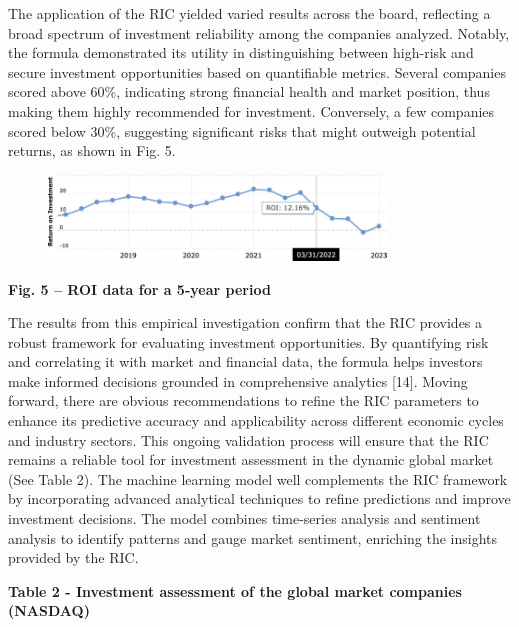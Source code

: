 {The application of the RIC yielded varied results across the board,
reflecting a broad spectrum of investment reliability among the
companies analyzed. Notably, the formula demonstrated its utility in
distinguishing between high-risk and secure investment opportunities
based on quantifiable metrics. Several companies scored above 60\%,
indicating strong financial health and market position, thus making them
highly recommended for investment. Conversely, a few companies scored
below 30\%, suggesting significant risks that might outweigh potential
returns, as shown in Fig. 5.

\begin{figure}[H]
	\centering
	\includegraphics[width=0.8\textwidth]{media/ict2/image13}
	\caption*{}
\end{figure}


{\bfseries Fig. 5 -- ROI data for a 5-year period}

The results from this empirical investigation confirm that the RIC
provides a robust framework for evaluating investment opportunities. By
quantifying risk and correlating it with market and financial data, the
formula helps investors make informed decisions grounded in
comprehensive analytics {[}14{]}. Moving forward, there are obvious
recommendations to refine the RIC parameters to enhance its predictive
accuracy and applicability across different economic cycles and industry
sectors. This ongoing validation process will ensure that the RIC
remains a reliable tool for investment assessment in the dynamic global
market (See Table 2). The machine learning model well complements the
RIC framework by incorporating advanced analytical techniques to refine
predictions and improve investment decisions. The model combines
time-series analysis and sentiment analysis to identify patterns and
gauge market sentiment, enriching the insights provided by the RIC.

{\bfseries Table 2 - Investment assessment of the global market companies
(NASDAQ)}

}
